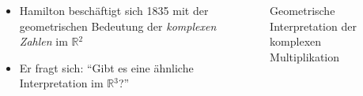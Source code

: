 \documentclass[aspectratio=169]{beamer}
\newcommand{\R}{\ensuremath{\mathbb{R}}{ }}
\begin{document}
    \begin{frame}
        \begin{columns}
        \begin{column}{0.5\textwidth}
            \begin{itemize}
                \item
                    Hamilton beschäftigt sich 1835 mit der geometrischen Bedeutung der \emph{komplexen Zahlen} im \(\R^2\)

                \item
                    Er fragt sich:
                    \enquote{Gibt es eine ähnliche Interpretation im \(\R^3\)?}
            \end{itemize}
        \end{column}
        \begin{column}{0.5\textwidth}
            \begin{figure}
                
                \caption{Geometrische Interpretation der komplexen Multiplikation \cite{komplexe_multiplikation}}
            \end{figure}
        \end{column}
        \end{columns}
    \end{frame}
\end{document}
